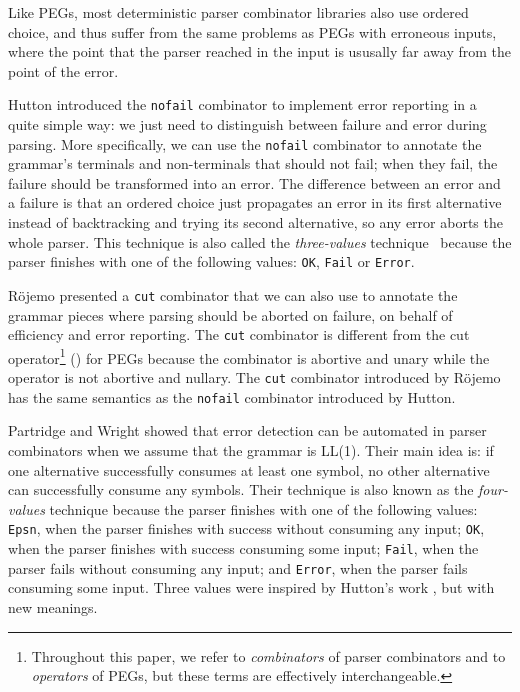 \documentclass[3p,12pt,singlecolumn]{elsarticle}
\begin{document}
Like PEGs, most deterministic parser combinator libraries 
also use ordered choice, and thus suffer from the same
problems as PEGs with erroneous inputs, where the point
that the parser reached in the input is ususally far away
from the point of the error.

Hutton \cite{hutton1992hfp} introduced the \texttt{nofail} combinator
to implement error reporting in a quite simple way:
we just need to distinguish between failure and error during parsing.
More specifically, we can use the \texttt{nofail} combinator to
annotate the grammar's terminals and non-terminals that should
not fail; when they fail, the failure should be transformed into an
error. The difference between an error and a failure is that
an ordered choice just propagates an error in its first alternative
instead of backtracking and trying its second alternative, so any
error aborts the whole parser.
This technique is also called the \emph{three-values} technique~\cite{partridge1996fv}
because the parser finishes with one of the following values:
\texttt{OK}, \texttt{Fail} or \texttt{Error}.

Röjemo \cite{rojemo1995epc} presented a \texttt{cut} combinator
that we can also use to annotate the grammar pieces where
parsing should be aborted on failure, on behalf of efficiency and
error reporting.
The \texttt{cut} combinator is different from the cut operator\footnote{Throughout this paper, we refer to {\em combinators}
of parser combinators and to {\em operators} of PEGs, but these terms are effectively interchangeable.} () for PEGs because the combinator is abortive and unary
while the operator is not abortive and nullary.
The \texttt{cut} combinator introduced by Röjemo has the same
semantics as the \texttt{nofail} combinator introduced by Hutton.


Partridge and Wright \cite{partridge1996fv} showed that error detection
can be automated in parser combinators when we assume that the grammar
is LL(1).
Their main idea is:
if one alternative successfully consumes at least one symbol,
no other alternative can successfully consume any symbols.
Their technique is also known as the \emph{four-values} technique
because the parser finishes with one of the following values:
\texttt{Epsn}, when the parser finishes with success without
consuming any input;
\texttt{OK}, when the parser finishes with success consuming
some input;
\texttt{Fail}, when the parser fails without consuming any input; and
\texttt{Error}, when the parser fails consuming some input.
Three values were inspired by Hutton's work \cite{hutton1992hfp},
but with new meanings.
\end{document}
